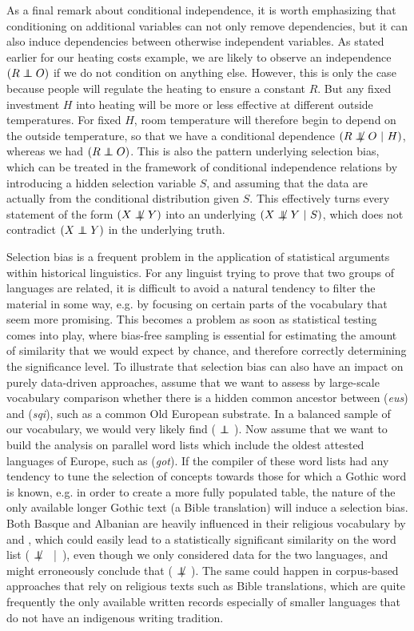 As a final remark about conditional independence, it is worth emphasizing that conditioning on additional variables can not only remove dependencies, but it can also induce dependencies between otherwise independent variables. As stated earlier for our heating costs example, we are likely to observe an independence $(R \independent O)$ if we do not condition on anything else. However, this is only the case because people will regulate the heating to ensure a constant $R$. But any fixed investment $H$ into heating will be more or less effective at different outside temperatures. For fixed $H$, room temperature will therefore begin to depend on the outside temperature, so that we have a conditional dependence $(R \notindep O\ |\ H)$, whereas we had $(R \independent O)$. This is also the pattern underlying selection bias, which can be treated in the framework of conditional independence relations by introducing a hidden selection variable $S$, and assuming that the data are actually from the conditional 
distribution given $S$. This effectively turns every statement of the form $(X \notindep Y)$ into an underlying $(X \notindep Y\ |\ S)$, which does not contradict $(X \independent Y)$ in the underlying truth. 

Selection bias is a frequent problem in the application of statistical arguments within historical linguistics. For any linguist trying to prove that two groups of languages are related, it is difficult to avoid a natural tendency to filter the material in some way, e.g. by focusing on certain parts of the vocabulary that seem more promising. This becomes a problem as soon as statistical testing comes into play, where bias-free sampling is essential for estimating the amount of similarity that we would expect by chance, and therefore correctly determining the significance level. To illustrate that selection bias can also have an impact on purely data-driven approaches, assume that we want to assess by large-scale vocabulary comparison whether there is a hidden common ancestor between  (\textit{eus}) and  (\textit{sqi}), such as a common Old European substrate. In a balanced sample of our vocabulary, we would very likely find ( $\independent$ ). Now assume that we want to build the analysis on parallel word lists which include the oldest attested languages of Europe, such as  (\textit{got}). If the compiler of these word lists had any tendency to tune the selection of concepts towards those for which a Gothic word is known, e.g. in order to create a more fully populated table, the nature of the only available longer Gothic text (a Bible translation) will induce a selection bias. Both Basque and Albanian are heavily influenced in their religious vocabulary by  and , which could easily lead to a statistically significant similarity on the word list ( $\notindep$ \ |\ ), even though we only considered data for the two languages, and might erroneously conclude that ( $\notindep$ ). The same could happen in corpus-based approaches that rely on religious texts such as Bible translations, which are quite frequently the only available written records especially of smaller languages that do not have an indigenous writing tradition.

